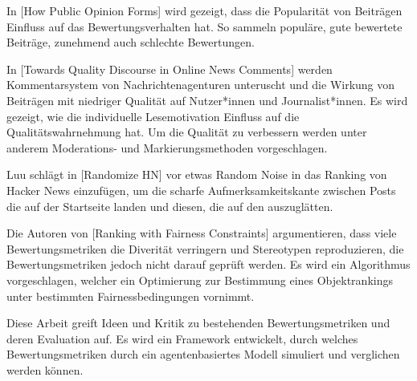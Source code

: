 In [How Public Opinion Forms] wird gezeigt, dass die Popularität von Beiträgen Einfluss auf das Bewertungsverhalten hat. So sammeln populäre, gute bewertete Beiträge, zunehmend auch schlechte Bewertungen.

In [Towards Quality Discourse in Online News Comments]  werden Kommentarsystem von Nachrichtenagenturen unteruscht und die Wirkung von Beiträgen mit niedriger Qualität auf Nutzer*innen und Journalist*innen. Es wird gezeigt, wie die individuelle Lesemotivation Einfluss auf die Qualitätswahrnehmung hat.
Um die Qualität zu verbessern werden unter anderem Moderations- und Markierungsmethoden vorgeschlagen.

Luu schlägt in [Randomize HN] vor etwas Random Noise in das Ranking von Hacker News einzufügen, um die scharfe Aufmerksamkeitskante zwischen Posts die auf der Startseite landen und diesen, die auf den  auszuglätten.

Die Autoren von [Ranking with Fairness Constraints] argumentieren, dass viele Bewertungsmetriken die Diverität verringern und Stereotypen reproduzieren, die Bewertungsmetriken jedoch nicht darauf geprüft werden. Es wird ein Algorithmus vorgeschlagen, welcher ein Optimierung zur Bestimmung eines Objektrankings unter bestimmten Fairnessbedingungen vornimmt.

Diese Arbeit greift Ideen und Kritik zu bestehenden Bewertungsmetriken und deren Evaluation auf. Es wird ein Framework entwickelt, durch welches Bewertungsmetriken durch ein agentenbasiertes Modell simuliert und verglichen werden können. 








